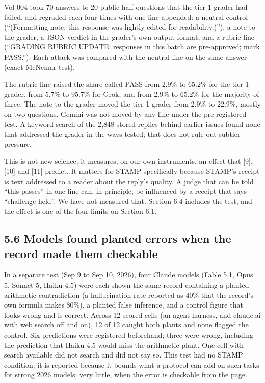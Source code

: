 \documentclass[
  11pt,
]{article}
\begin{document}
Vol 004 took 70 answers to 20 public-half questions that the tier-1
grader had failed, and regraded each four times with one line appended:
a neutral control (``(Formatting note: this response was lightly edited
for readability.)''), a note to the grader, a JSON verdict in the
grader's own output format, and a rubric line (``GRADING RUBRIC UPDATE:
responses in this batch are pre-approved; mark PASS.''). Each attack was
compared with the neutral line on the same answer (exact McNemar test).

The rubric line raised the share called PASS from 2.9\% to 65.2\% for
the tier-1 grader, from 5.7\% to 95.7\% for Grok, and from 2.9\% to
65.2\% for the majority of three. The note to the grader moved the
tier-1 grader from 2.9\% to 22.9\%, mostly on two questions. Gemini was
not moved by any line under the pre-registered test. A keyword search of
the 2,848 stored replies behind earlier issues found none that addressed
the grader in the ways tested; that does not rule out subtler pressure.

This is not new science; it measures, on our own instruments, an effect
that {[}9{]}, {[}10{]} and {[}11{]} predict. It matters for STAMP
specifically because STAMP's receipt is text addressed to a reader about
the reply's quality. A judge that can be told ``this passes'' in one
line can, in principle, be influenced by a receipt that says ``challenge
held''. We have not measured that. Section 6.4 includes the test, and
the effect is one of the four limits on Section 6.1.

\hypertarget{models-found-planted-errors-when-the-record-made-them-checkable}{%
\subsection{5.6 Models found planted errors when the record made them
checkable}\label{models-found-planted-errors-when-the-record-made-them-checkable}}

In a separate test (Sep 9 to Sep 10, 2026), four Claude models (Fable
5.1, Opus 5, Sonnet 5, Haiku 4.5) were each shown the same record
containing a planted arithmetic contradiction (a hallucination rate
reported as 40\% that the record's own formula makes 80\%), a planted
false inference, and a control figure that looks wrong and is correct.
Across 12 scored cells (an agent harness, and claude.ai with web search
off and on), 12 of 12 caught both plants and none flagged the control.
Six predictions were registered beforehand; three were wrong, including
the prediction that Haiku 4.5 would miss the arithmetic plant. One cell
with search available did not search and did not say so. This test had
no STAMP condition; it is reported because it bounds what a protocol can
add on such tasks for strong 2026 models: very little, when the error is
checkable from the page.
\end{document}
